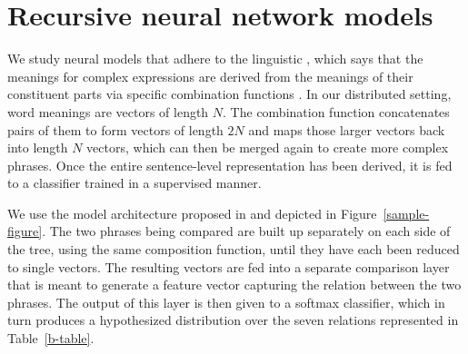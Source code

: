 \section{Recursive neural network models} \label{methods}

We study neural models that adhere to the linguistic , which says that the meanings for complex
expressions are derived from the meanings of their constituent parts
via specific combination functions \cite{Partee84,Janssen97}. In our
distributed setting, word meanings are vectors of length $N$. The
combination function concatenates pairs of them to form vectors of
length $2N$ and maps those larger vectors back into length $N$
vectors, which can then be merged again to create more complex
phrases. Once the entire sentence-level representation has been
derived, it is fed to a classifier trained in a supervised manner.


We use the model architecture proposed in \cite{bowman2013can} and
depicted in Figure~\ref{sample-figure}. The two phrases being compared
are built up separately on each side of the tree, using the same
composition function, until they have each been reduced to single
vectors. The resulting vectors are fed into a separate comparison
layer that is meant to generate a feature vector capturing the
relation between the two phrases. The output of this layer is then
given to a softmax classifier, which in turn produces a hypothesized
distribution over the seven relations represented in Table~\ref{b-table}.

